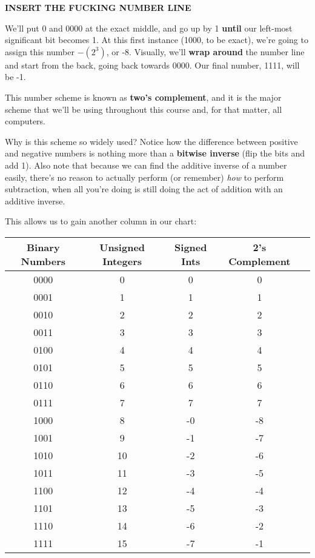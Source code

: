 \documentclass[12pt]{article}
\begin{document}
    \textbf{INSERT THE FUCKING NUMBER LINE}

    We'll put 0 and 0000 at the exact middle, and go up by 1 \textbf{until} our
    left-most significant bit becomes 1. At this first instance (1000, to be exact),
    we're going to assign this number $-(2^3)$, or -8. Visually, we'll \textbf{wrap around}
    the number line and start from the back, going back towards 0000. Our final number, 1111,
    will be -1.

    This number scheme is known as \textbf{two's complement}, and it is the major scheme
    that we'll be using throughout this course and, for that matter, all computers.

    Why is this scheme so widely used? %
    Notice how the difference between positive and negative
    numbers is nothing more than a \textbf{bitwise inverse} (flip the bits and add 1). Also note that because we can find
    the additive inverse of a number easily, there's no reason to actually perform (or remember)
    \textit{how} to perform subtraction, when all you're doing is still doing the act of addition
    with an additive inverse.

    This allows us to gain another column in our chart:

    \begin{center}
        \begin{tabular}{|c|c|c|c|c|}
          \hline
          Binary Numbers & Unsigned Integers & Signed Ints & 2's Complement \\
          \hline
          0000 & 0 & 0 & 0 \\ 
          0001 & 1 & 1 & 1\\  
          0010 & 2 & 2 & 2\\  
          0011 & 3 & 3 & 3\\  
          0100 & 4 & 4 & 4\\  
          0101 & 5 & 5 & 5\\  
          0110 & 6 & 6 & 6\\         
          0111 & 7 & 7 & 7\\  
          1000 & 8 & -0 & -8 \\  
          1001 & 9 & -1 & -7 \\  
          1010 & 10 & -2 & -6 \\
          1011 & 11 & -3 & -5 \\
          1100 & 12 & -4 & -4 \\
          1101 & 13 & -5 & -3 \\
          1110 & 14 & -6 & -2 \\
          1111 & 15 & -7 & -1 \\
          \hline
        \end{tabular}
    \end{center}
\end{document}
